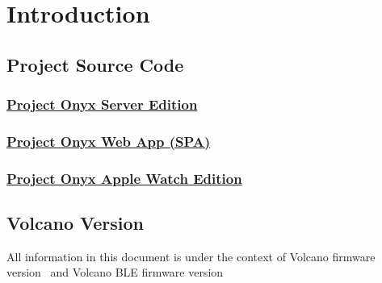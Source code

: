 \chapter{Introduction}
\section{Project Source Code}
    \subsection*{\href{https://github.com/ImACoderImACoderImACoder/ProjectOnyxServerEdition}{Project Onyx Server Edition}}
    \subsection*{\href{https://github.com/ImACoderImACoderImACoder/onyx}{Project Onyx Web App (SPA)}}
    \subsection*{\href{https://github.com/ImACoderImACoderImACoder/ProjectOnyxAppleWatchFiles}{Project Onyx Apple Watch Edition}}

\section{Volcano Version}
All information in this document is under the context of Volcano firmware version \volcanoFirmwareVersion\ and Volcano BLE firmware version \volcanoBleFirmwareVersion\